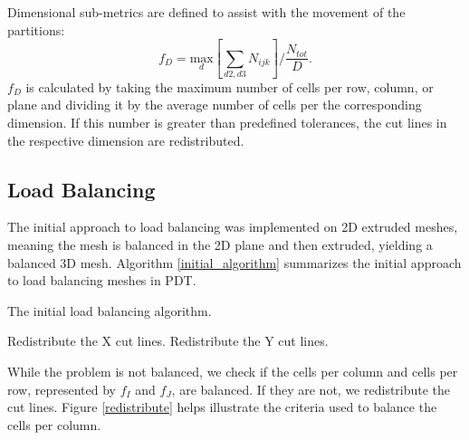 \documentclass[11pt, letterpaper,titlepage,oneside]{article}
\begin{document}
Dimensional sub-metrics are defined to assist with the movement of the partitions:
\begin{equation}
f_{D} = \underset{d}{\text{max}}[\sum_{d2,d3} N_{ijk}]/\frac{N_{tot}}{D}.
\end{equation}
$f_{D}$ is calculated by taking the maximum number of cells per row, column, or plane and dividing it by the average number of cells per the corresponding dimension. If this number is greater than predefined tolerances, the cut lines in the respective dimension are redistributed. 

\subsection{Load Balancing}

The initial approach to load balancing was implemented on 2D extruded meshes, meaning the mesh is balanced in the 2D plane and then extruded, yielding a balanced 3D mesh. Algorithm \ref{initial_algorithm} summarizes the initial approach to load balancing meshes in PDT.

\begin{algorithm}[H]
\caption{The initial load balancing algorithm.}
\label{initial_algorithm}
\begin{algorithmic}

    \STATE Redistribute the X cut lines.
  \ENDIF
  	\STATE Redistribute the Y cut lines.
  \ENDIF
\ENDWHILE
\end{algorithmic}
\end{algorithm}

While the problem is not balanced, we check if the cells per column and cells per row, represented by $f_I$ and $f_J$, are balanced. If they are not, we redistribute the cut lines. Figure \ref{redistribute} helps illustrate the criteria used to balance the cells per column. 
\end{document}
